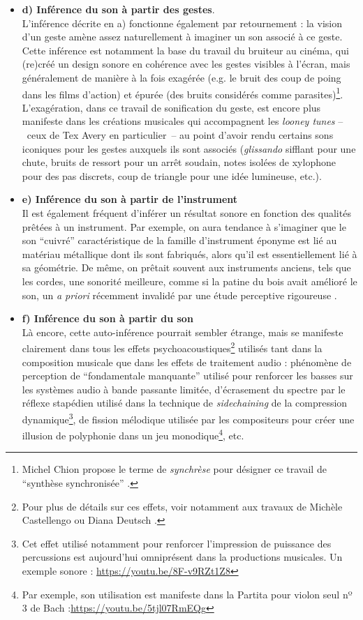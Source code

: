 \begin{itemize}[noitemsep]
	\item \textbf{d) Inférence du son à partir des gestes}.\\
	L'inférence décrite en a) fonctionne également par retournement : la vision d'un geste amène assez naturellement à imaginer un son associé à ce geste. Cette inférence est notamment la base du travail du bruiteur au cinéma, qui (re)créé un design sonore en cohérence avec les gestes visibles à l'écran, mais généralement de manière à la fois exagérée (e.g. le bruit des coup de poing dans les films d'action) et épurée (des bruits considérés comme parasites)\footnote{Michel Chion propose le terme de \textit{synchrèse} pour désigner ce travail de ``synthèse synchronisée'' \cite{chion_audio-vision:_2013}.}. L'exagération, dans ce travail de sonification du geste, est encore plus manifeste dans les créations musicales qui accompagnent les \textit{looney tunes} --~ceux de Tex Avery en particulier~-- au point d'avoir rendu certains sons iconiques pour les gestes auxquels ils sont associés (\textit{glissando} sifflant pour une chute, bruits de ressort pour un arrêt soudain, notes isolées de xylophone pour des pas discrets, coup de triangle pour une idée lumineuse, etc.).

	\item \textbf{e) Inférence du son à partir de l'instrument}\\
	Il est également fréquent d'inférer un résultat sonore en fonction des qualités prêtées à un instrument. Par exemple, on aura tendance à s'imaginer que le son ``cuivré'' caractéristique de la famille d'instrument éponyme est lié au matériau métallique dont ils sont fabriqués, alors qu'il est essentiellement lié à sa géométrie. De même, on prêtait souvent aux instruments anciens, tels que les cordes, une sonorité meilleure, comme si la patine du bois avait amélioré le son, un \textit{a priori} récemment invalidé par une étude perceptive rigoureuse \cite{fritz_listener_2017}.

	\item \textbf{f) Inférence du son à partir du son}\\
	Là encore, cette auto-inférence pourrait sembler étrange, mais se manifeste clairement dans tous les effets psychoacoustiques\footnote{Pour plus de détails sur ces effets, voir notamment aux travaux de Michèle Castellengo \cite{castellengo_ecoute_2015} ou Diana Deutsch \cite{deutsch_psychology_2013}.} utilisés tant dans la composition musicale que dans les effets de traitement audio : phénomène de perception de ``fondamentale manquante'' utilisé pour renforcer les basses sur les systèmes audio à bande passante limitée, d'écrasement du spectre par le réflexe stapédien utilisé dans la technique de \textit{sidechaining} de la compression dynamique\footnote{Cet effet utilisé notamment pour renforcer l'impression de puissance des percussions est aujourd'hui omniprésent dans la productions musicales. Un exemple sonore : \url{https://youtu.be/8F-v9RZt1Z8}}, de fission mélodique utilisée par les compositeurs pour créer une illusion de polyphonie dans un jeu monodique\footnote{Par exemple, son utilisation est manifeste dans la Partita pour violon seul nº 3 de Bach :\url{https://youtu.be/5tjl07RmEQg}}, etc. 


\end{itemize}
